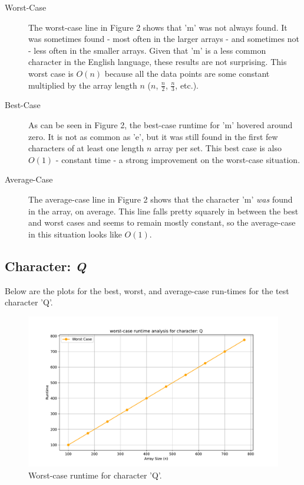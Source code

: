 \documentclass{article}
\begin{document}
\begin{description}
    \item[Worst-Case] The worst-case line in Figure 2 shows that 'm' was not always found. It was sometimes found - most often in the larger arrays - and sometimes not - less often in the smaller arrays. Given that 'm' is a less common character in the English language, these results are not surprising. This worst case is $O(n)$ because all the data points are some constant multiplied by the array length $n$ ($n$, $\frac{n}{2}$, $\frac{n}{3}$, etc.).
    \item[Best-Case] As can be seen in Figure 2, the best-case runtime for 'm' hovered around zero. It is not as common as 'e', but it was still found in the first few characters of at least one length $n$ array per set. This best case is also $O(1)$ - constant time - a strong improvement on the worst-case situation. 
    \item[Average-Case] The average-case line in Figure 2 shows that the character 'm' \textit{was} found in the array, on average. This line falls pretty squarely in between the best and worst cases and seems to remain mostly constant, so the average-case in this situation looks like $O(1)$. 
\end{description}

\subsection{Character: \textit{Q}}
Below are the plots for the best, worst, and average-case run-times for the test character 'Q'.
	
	\begin{figure}[H]
		\centering
		\includegraphics[width=\textwidth]{runtime_analysis_worst_Q.pdf}
		\caption{Worst-case runtime for character 'Q'.}
	\end{figure}
\end{document}
